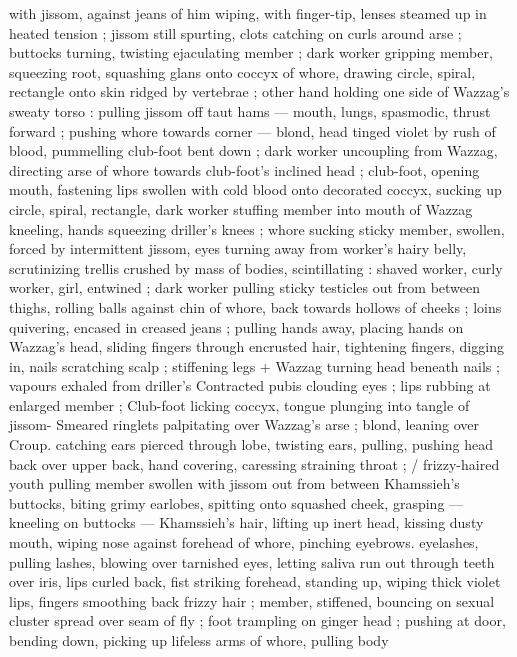 with jissom, against jeans of him wiping, with finger-tip, lenses 
steamed up in heated tension ; jissom still spurting, clots catching on 
curls around arse ; buttocks turning, twisting ejaculating member ; 
dark worker gripping member, squeezing root, squashing glans onto 
coccyx of whore, drawing circle, spiral, rectangle onto skin ridged by 
vertebrae ; other hand holding one side of Wazzag's sweaty torso : 
pulling jissom off taut hams --- mouth, lungs, spasmodic, thrust 
forward ; pushing whore towards corner --- blond, head tinged violet 
by rush of blood, pummelling club-foot bent down ; dark worker 
uncoupling from Wazzag, directing arse of whore towards club-foot's 
inclined head ; club-foot, opening mouth, fastening lips swollen with 
cold blood onto decorated coccyx, sucking up circle, spiral, 
rectangle, dark worker stuffing member into mouth of Wazzag 
kneeling, hands squeezing driller's knees ; whore sucking sticky 
member, swollen, forced by intermittent jissom, eyes turning away 
from worker's hairy belly, scrutinizing trellis crushed by mass of 
bodies, scintillating : shaved worker, curly worker, girl, entwined ; 
dark worker pulling sticky testicles out from between thighs, rolling 
balls against chin of whore, back towards hollows of cheeks ; loins 
quivering, encased in creased jeans ; pulling hands away, placing 
hands on Wazzag's head, sliding fingers through encrusted hair, 
tightening fingers, digging in, nails scratching scalp ; stiffening legs 
+ Wazzag turning head beneath nails ; vapours exhaled from driller's 
Contracted pubis clouding eyes ; lips rubbing at enlarged member ; 
Club-foot licking coccyx, tongue plunging into tangle of jissom- 
Smeared ringlets palpitating over Wazzag's arse ; blond, leaning over 
Croup. catching ears pierced through lobe, twisting ears, pulling, 
pushing head back over upper back, hand covering, caressing 
straining throat ; {\slash} frizzy-haired youth pulling member swollen with 
jissom out from between Khamssieh's buttocks, biting grimy 
earlobes, spitting onto squashed cheek, grasping --- kneeling on 
buttocks --- Khamssieh's hair, lifting up inert head, kissing dusty 
mouth, wiping nose against forehead of whore, pinching eyebrows. 
eyelashes, pulling lashes, blowing over tarnished eyes, letting saliva 
run out through teeth over iris, lips curled back, fist striking 
forehead, standing up, wiping thick violet lips, fingers smoothing 
back frizzy hair ; member, stiffened, bouncing on sexual cluster 
spread over seam of fly ; foot trampling on ginger head ; pushing at 
door, bending down, picking up lifeless arms of whore, pulling body 
